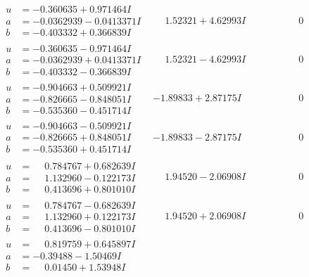 \documentclass[1p]{elsarticle_modified}
\theoremstyle{definition}
\begin{document}
$$\begin{array}{c|c|c}
\begin{aligned}
u &= -0.360635 + 0.971464 I \\
a &= -0.0362939 - 0.0413371 I \\
b &= -0.403332 + 0.366839 I\end{aligned}
 & \phantom{-}1.52321 + 4.62993 I & \phantom{-0.000000 } 0 \\ \hline\begin{aligned}
u &= -0.360635 - 0.971464 I \\
a &= -0.0362939 + 0.0413371 I \\
b &= -0.403332 - 0.366839 I\end{aligned}
 & \phantom{-}1.52321 - 4.62993 I & \phantom{-0.000000 } 0 \\ \hline\begin{aligned}
u &= -0.904663 + 0.509921 I \\
a &= -0.826665 - 0.848051 I \\
b &= -0.535360 - 0.451714 I\end{aligned}
 & -1.89833 + 2.87175 I & \phantom{-0.000000 } 0 \\ \hline\begin{aligned}
u &= -0.904663 - 0.509921 I \\
a &= -0.826665 + 0.848051 I \\
b &= -0.535360 + 0.451714 I\end{aligned}
 & -1.89833 - 2.87175 I & \phantom{-0.000000 } 0 \\ \hline\begin{aligned}
u &= \phantom{-}0.784767 + 0.682639 I \\
a &= \phantom{-}1.132960 - 0.122173 I \\
b &= \phantom{-}0.413696 + 0.801010 I\end{aligned}
 & \phantom{-}1.94520 - 2.06908 I & \phantom{-0.000000 } 0 \\ \hline\begin{aligned}
u &= \phantom{-}0.784767 - 0.682639 I \\
a &= \phantom{-}1.132960 + 0.122173 I \\
b &= \phantom{-}0.413696 - 0.801010 I\end{aligned}
 & \phantom{-}1.94520 + 2.06908 I & \phantom{-0.000000 } 0 \\ \hline\begin{aligned}
u &= \phantom{-}0.819759 + 0.645897 I \\
a &= -0.39488 - 1.50469 I \\
b &= \phantom{-}0.01450 + 1.53948 I\end{aligned}

\end{array}$$
\end{document}
